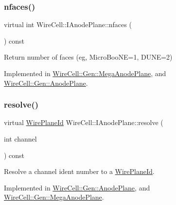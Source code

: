 \subsubsection{\texorpdfstring{nfaces()}{nfaces()}}
{\footnotesize\ttfamily virtual int Wire\+Cell\+::\+I\+Anode\+Plane\+::nfaces (\begin{DoxyParamCaption}{ }\end{DoxyParamCaption}) const\hspace{0.3cm}{\ttfamily [pure virtual]}}



Return number of faces (eg, Micro\+Boo\+NE=1, D\+U\+NE=2) 



Implemented in \hyperlink{class_wire_cell_1_1_gen_1_1_mega_anode_plane_a4ccf1f789e1f62b35993d95b659b92c3}{Wire\+Cell\+::\+Gen\+::\+Mega\+Anode\+Plane}, and \hyperlink{class_wire_cell_1_1_gen_1_1_anode_plane_a67547b54d01b3112b8a194660d1d2f2a}{Wire\+Cell\+::\+Gen\+::\+Anode\+Plane}.

\mbox{\label{class_wire_cell_1_1_i_anode_plane_a566ba20aec7e85b99a9f4304f073afa0}} 
\subsubsection{\texorpdfstring{resolve()}{resolve()}}
{\footnotesize\ttfamily virtual \hyperlink{class_wire_cell_1_1_wire_plane_id}{Wire\+Plane\+Id} Wire\+Cell\+::\+I\+Anode\+Plane\+::resolve (\begin{DoxyParamCaption}\item[{int}]{channel }\end{DoxyParamCaption}) const\hspace{0.3cm}{\ttfamily [pure virtual]}}



Resolve a channel ident number to a \hyperlink{class_wire_cell_1_1_wire_plane_id}{Wire\+Plane\+Id}. 



Implemented in \hyperlink{class_wire_cell_1_1_gen_1_1_anode_plane_abfe29b697f36910a6b7a08c9e4b984bd}{Wire\+Cell\+::\+Gen\+::\+Anode\+Plane}, and \hyperlink{class_wire_cell_1_1_gen_1_1_mega_anode_plane_a39f210db553e1e981412c2c44861870c}{Wire\+Cell\+::\+Gen\+::\+Mega\+Anode\+Plane}.

